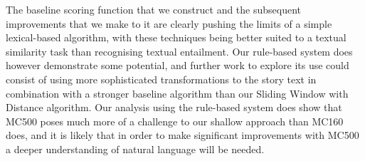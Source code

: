 
%
%
%


The baseline scoring function that we construct and the subsequent improvements that we make to it are clearly pushing the limits of a simple lexical-based algorithm, with these techniques being better suited to a textual similarity task than recognising textual entailment. Our rule-based system does however demonstrate some potential, and further work to explore its use could consist of using more sophisticated transformations to the story text in combination with a stronger baseline algorithm than our Sliding Window with Distance algorithm. Our analysis using the rule-based system does show that MC500 poses much more of a challenge to our shallow approach than MC160 does, and it is likely that in order to make significant improvements with MC500 a deeper understanding of natural language will be needed.